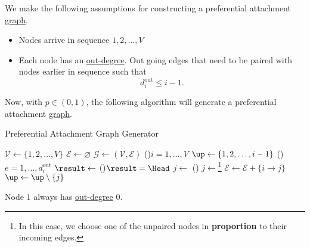 We make the following assumptions for constructing a preferential attachment \hyperref[def:graph]{graph}.
\begin{itemize}
	\item Nodes arrive in sequence \(1, 2, \dots , V\)
	\item Each node has an \hyperref[def:out-degree]{out-degree}. Out going edges that need to be paired with nodes earlier in sequence such that
	      \[
		      d_{i}^{\text{out}} \leq i - 1.
	      \]
\end{itemize}

Now, with \(p\in(0, 1)\), the following algorithm will generate a preferential attachment \hyperref[def:graph]{graph}.

\begin{algorithm}[H]\label{algo:preferential-attachment-graph-generator-algo}
	\DontPrintSemicolon{}
	\caption{Preferential Attachment Graph Generator}
	\BlankLine

	\(\mathcal{V} \gets \{1, 2, \dots , V\}\)\;
	\(\mathcal{E} \gets \varnothing\)\;
	\(\mathcal{G} \gets (\mathcal{V} , \mathcal{E} )\) 
	\;
	\For(){\(i = 1, \dots  , V\)}{
	\(\up\gets \{1, 2, \dots , i-1 \}\)
	\For(){\(e = 1, \dots, d^{\text{out}}_i\)}{
	\(\result\gets\) 
	\uIf(){\(\result = \Head\)}{
		\(j\gets\)\rand{\(\up\) }
	}\Else(){
	\(j\gets \)\footnote{In this case, we choose one of the unpaired nodes in \textbf{proportion} to their incoming edges.}\;
	}
	\;
	\(\mathcal{E} \gets \mathcal{E} + \{i \to j\}\)
	\(\up\gets \up \setminus \{j\}\)
	}
	}

	\;
\end{algorithm}

\begin{remark}
	Node \(1 \) always has \hyperref[def:out-degree]{out-degree} \(0\).
\end{remark}

